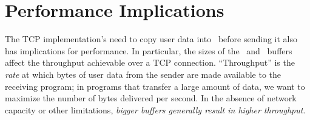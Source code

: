 



\section{Performance Implications}

The TCP implementation's need to copy user data into \sque\ before
sending it also has implications for performance.  In
particular, the sizes of the \sque\ and \rque\ buffers
affect the throughput achievable over a TCP connection.  ``Throughput''
is the \emph{rate} at which bytes of user data from the sender are
made available to the receiving program; in programs that transfer a
large amount of data, we want to maximize the number of bytes
delivered per second.  In the absence
of network capacity or other limitations, \emph{bigger buffers generally
result in higher throughput}.

